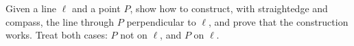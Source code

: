 Given a line $\ell$ and a point $P$, show how to construct, with straightedge and compass, the line through $P$ perpendicular to $\ell$, and prove that the construction works. Treat both cases: $P$ not on $\ell$, and $P$ on $\ell$.
